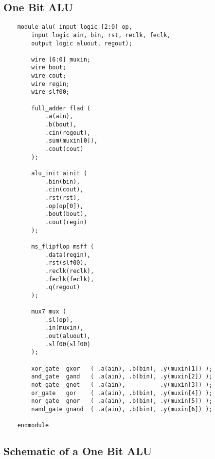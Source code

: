 \documentclass[../main]{subfiles}
\begin{document}
\subsection {One Bit ALU}

\begin{verbatim}
    module alu( input logic [2:0] op,
        input logic ain, bin, rst, reclk, feclk,
        output logic aluout, regout);

        wire [6:0] muxin;
        wire bout;
        wire cout;
        wire regin;
        wire slf00;

        full_adder flad (
            .a(ain),
            .b(bout),
            .cin(regout),
            .sum(muxin[0]),
            .cout(cout)
        );

        alu_init ainit (
            .bin(bin),
            .cin(cout),
            .rst(rst),
            .op(op[0]),
            .bout(bout),
            .cout(regin)
        );

        ms_flipflop msff (
            .data(regin),
            .rst(slf00),
            .reclk(reclk),
            .feclk(feclk),
            .q(regout)
        );

        mux7 mux (
            .sl(op),
            .in(muxin),
            .out(aluout),
            .slf00(slf00)
        );

        xor_gate  gxor   ( .a(ain), .b(bin), .y(muxin[1]) );
        and_gate  gand   ( .a(ain), .b(bin), .y(muxin[2]) );
        not_gate  gnot   ( .a(ain),          .y(muxin[3]) );
        or_gate   gor    ( .a(ain), .b(bin), .y(muxin[4]) );
        nor_gate  gnor   ( .a(ain), .b(bin), .y(muxin[5]) );
        nand_gate gnand  ( .a(ain), .b(bin), .y(muxin[6]) );

    endmodule
\end{verbatim}

\clearpage

\subsection {Schematic of a One Bit ALU}
\end{document}
